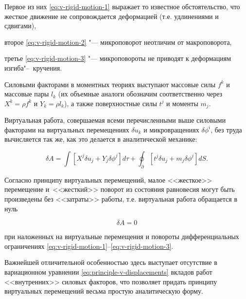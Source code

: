 Первое из них \eqref{eq:v-rigid-motion-1} выражает то известное обстоятельство, что жесткое движение не сопровождается деформацией (т.е. удлинениями и сдвигами), 

второе \eqref{eq:v-rigid-motion-2} "--- микроповорот неотличим от макроповорота, 

третье \eqref{eq:v-rigid-motion-3} "--- микроповороты не приводят к деформациям изгиба"--~кручения.



Силовыми факторами в моментных теориях выступают массовые силы \(f^k\) и массовые пары \(l_k\) (их объемные аналоги обозначим соответственно через \(X^k=\rho f^k\) и \(Y_k=\rho l_k\)), а также поверхностные силы \(t^j\) и моменты \(m_j\).



Виртуальная работа, совершаемая всеми перечисленными выше силовыми факторами на виртуальных перемещениях \(\delta u_k\) и микровращениях \(\delta\phi^i\), без труда вычисляется так же, как это делается в аналитической механике:

\begin{equation}

\delta A=\int\left[{X^j\delta u_j+Y_j\delta\phi^j}\right]d\tau+\oint _\partial\left[{t^j\delta u_j+m_j\delta\phi^j}\right]dS.

\label{eq:virtual-work}

\end{equation}



Согласно принципу виртуальных перемещений, малое <<жесткое>> перемещение и~<<жесткий>> поворот из состояния равновесия могут быть произведены без <<затраты>> работы, т.е. виртуальная работа обращается в нуль

\begin{equation}

\delta A=0

\label{eq:principle-v-displacements}

\end{equation}

при наложенных на виртуальные перемещения и повороты дифференциальных ограничениях \eqref{eq:v-rigid-motion-1}--\eqref{eq:v-rigid-motion-3}. 

Важнейшей отличительной особенностью здесь выступает отсутствие в вариационном уравнении \eqref{eq:principle-v-displacements} вкладов работ <<внутренних>> силовых факторов, что позволяет придать принципу виртуальных перемещений весьма простую аналитическую форму.



